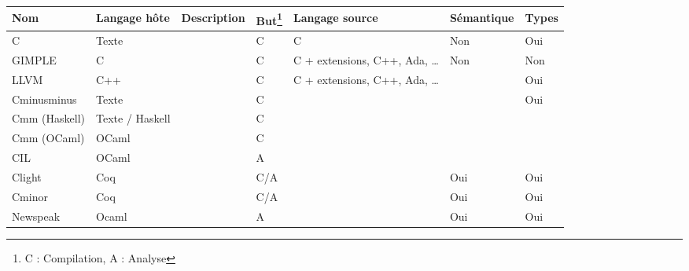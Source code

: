 \def\ilfeatfna{\footnote{C : Compilation, A : Analyse}}

\begin{tabular}{| l || l | l | l | l | l | l |}
\hline
Nom           & Langage hôte    & Description       & But\ilfeatfna & Langage source                   &  Sémantique & Types \\ \hline \hline
C             & Texte           & \cite{AnsiC}      & C             & C                                &  Non        & Oui   \\ \hline
GIMPLE        & C               & \cite{gcc-gimple} & C             & C + extensions, C++, Ada, \ldots &  Non        & Non   \\ \hline
LLVM          & C++             & \cite{llvm-pres}  & C             & C + extensions, C++, Ada, \ldots &             & Oui   \\ \hline
Cminusminus   & Texte           & \cite{spjcmm}     & C             &                                  &             & Oui   \\ \hline
Cmm (Haskell) & Texte / Haskell &                   & C             &                                  &             &       \\ \hline
Cmm (OCaml)   & OCaml           &                   & C             &                                  &             &       \\ \hline
CIL           & OCaml           & \cite{NeculaCil}  & A             &                                  &             &       \\ \hline
Clight        & Coq             & \cite{cfront}     & C/A           &                                  &  Oui        & Oui   \\ \hline
Cminor        & Coq             & \cite{cminorSL}   & C/A           &                                  &  Oui        & Oui   \\ \hline
Newspeak      & Ocaml           & \cite{newspeak}   & A             &                                  &  Oui        & Oui   \\ \hline
\end{tabular}

